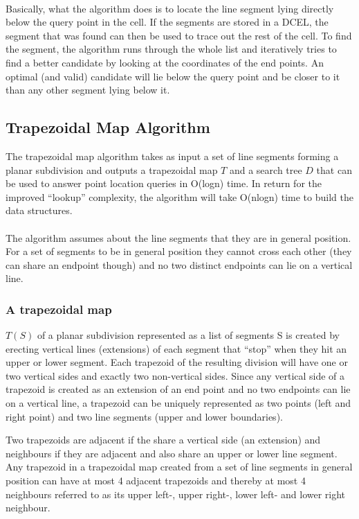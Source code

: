 \paragraph{}
Basically, what the algorithm does is to locate the line segment lying directly below the query point in the cell. If the segments are stored in a DCEL, the segment that was found can then be used to trace out the rest of the cell. To find the segment, the algorithm runs through the whole list and iteratively tries to find a better candidate by looking at the coordinates of the end points. An optimal (and valid) candidate will lie below the query point and be closer to it than any other segment lying below it. 

\subsection{Trapezoidal Map Algorithm}
The trapezoidal map algorithm takes as input a set of line segments forming a planar subdivision and outputs a trapezoidal map $T$ and a search tree $D$ that can be used to answer point location queries in O(logn) time. In return for the improved “lookup” complexity, the algorithm will take O(nlogn) time to build the data structures. 

\paragraph{}
The algorithm assumes about the line segments that they are in general position. For a set of segments to be in general position they cannot cross each other (they can share an endpoint though) and no two distinct endpoints can lie on a vertical line.

\subsubsection{A trapezoidal map}
$T(S)$ of a planar subdivision represented as a list of segments S is created by erecting vertical lines (extensions) of each segment that “stop” when they hit an upper or lower segment. Each trapezoid of the resulting division will have one or two vertical sides and exactly two non-vertical sides. Since any vertical side of a trapezoid is created as an extension of an end point and no two endpoints can lie on a vertical line, a trapezoid can be uniquely represented as two points (left and right point) and two line segments (upper and lower boundaries).

Two trapezoids are adjacent if the share a vertical side (an extension) and neighbours if they are adjacent and also share an upper or lower line segment. Any trapezoid in a trapezoidal map created from a set of line segments in general position can have at most 4 adjacent trapezoids and thereby at most 4 neighbours referred to as its upper left-, upper right-, lower left- and lower right neighbour.

